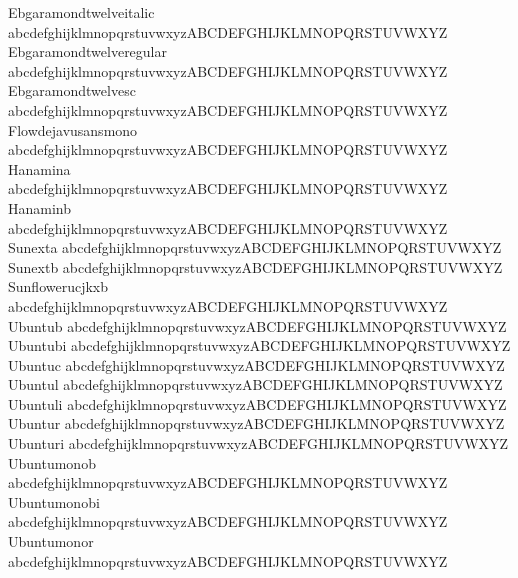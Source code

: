 \begin{tabbing}
Ebgaramondtwelveitalic \> {\mktsFontfileEbgaramondtwelveitalic{}abcdefghijklmnopqrstuvwxyzABCDEFGHIJKLMNOPQRSTUVWXYZ} \\
Ebgaramondtwelveregular \> {\mktsFontfileEbgaramondtwelveregular{}abcdefghijklmnopqrstuvwxyzABCDEFGHIJKLMNOPQRSTUVWXYZ} \\
Ebgaramondtwelvesc \> {\mktsFontfileEbgaramondtwelvesc{}abcdefghijklmnopqrstuvwxyzABCDEFGHIJKLMNOPQRSTUVWXYZ} \\
Flowdejavusansmono \> {\mktsFontfileFlowdejavusansmono{}abcdefghijklmnopqrstuvwxyzABCDEFGHIJKLMNOPQRSTUVWXYZ} \\
Hanamina \> {\mktsFontfileHanamina{}abcdefghijklmnopqrstuvwxyzABCDEFGHIJKLMNOPQRSTUVWXYZ} \\
Hanaminb \> {\mktsFontfileHanaminb{}abcdefghijklmnopqrstuvwxyzABCDEFGHIJKLMNOPQRSTUVWXYZ} \\
Sunexta \> {\mktsFontfileSunexta{}abcdefghijklmnopqrstuvwxyzABCDEFGHIJKLMNOPQRSTUVWXYZ} \\
Sunextb \> {\mktsFontfileSunextb{}abcdefghijklmnopqrstuvwxyzABCDEFGHIJKLMNOPQRSTUVWXYZ} \\
Sunflowerucjkxb \> {\mktsFontfileSunflowerucjkxb{}abcdefghijklmnopqrstuvwxyzABCDEFGHIJKLMNOPQRSTUVWXYZ} \\
Ubuntub \> {\mktsFontfileUbuntub{}abcdefghijklmnopqrstuvwxyzABCDEFGHIJKLMNOPQRSTUVWXYZ} \\
Ubuntubi \> {\mktsFontfileUbuntubi{}abcdefghijklmnopqrstuvwxyzABCDEFGHIJKLMNOPQRSTUVWXYZ} \\
Ubuntuc \> {\mktsFontfileUbuntuc{}abcdefghijklmnopqrstuvwxyzABCDEFGHIJKLMNOPQRSTUVWXYZ} \\
Ubuntul \> {\mktsFontfileUbuntul{}abcdefghijklmnopqrstuvwxyzABCDEFGHIJKLMNOPQRSTUVWXYZ} \\
Ubuntuli \> {\mktsFontfileUbuntuli{}abcdefghijklmnopqrstuvwxyzABCDEFGHIJKLMNOPQRSTUVWXYZ} \\
Ubuntur \> {\mktsFontfileUbuntur{}abcdefghijklmnopqrstuvwxyzABCDEFGHIJKLMNOPQRSTUVWXYZ} \\
Ubunturi \> {\mktsFontfileUbunturi{}abcdefghijklmnopqrstuvwxyzABCDEFGHIJKLMNOPQRSTUVWXYZ} \\
Ubuntumonob \> {\mktsFontfileUbuntumonob{}abcdefghijklmnopqrstuvwxyzABCDEFGHIJKLMNOPQRSTUVWXYZ} \\
Ubuntumonobi \> {\mktsFontfileUbuntumonobi{}abcdefghijklmnopqrstuvwxyzABCDEFGHIJKLMNOPQRSTUVWXYZ} \\
Ubuntumonor \> {\mktsFontfileUbuntumonor{}abcdefghijklmnopqrstuvwxyzABCDEFGHIJKLMNOPQRSTUVWXYZ} \\

\end{tabbing}
